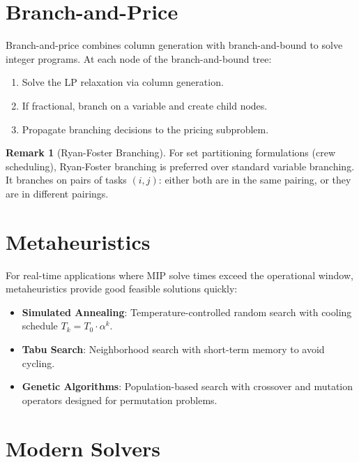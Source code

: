 \documentclass[11pt,a4paper]{book}
\theoremstyle{definition}
\newtheorem{remark}[theorem]{Remark}
\begin{document}
\section{Branch-and-Price}

Branch-and-price combines column generation with branch-and-bound to solve
integer programs. At each node of the branch-and-bound tree:
\begin{enumerate}
  \item Solve the LP relaxation via column generation.
  \item If fractional, branch on a variable and create child nodes.
  \item Propagate branching decisions to the pricing subproblem.
\end{enumerate}

\begin{remark}[Ryan-Foster Branching]
For set partitioning formulations (crew scheduling), Ryan-Foster branching
is preferred over standard variable branching. It branches on pairs of
tasks $(i,j)$: either both are in the same pairing, or they are in
different pairings.
\end{remark}

\section{Metaheuristics}

For real-time applications where MIP solve times exceed the operational
window, metaheuristics provide good feasible solutions quickly:

\begin{itemize}
  \item \textbf{Simulated Annealing}: Temperature-controlled random search
    with cooling schedule $T_k = T_0 \cdot \alpha^k$.
  \item \textbf{Tabu Search}: Neighborhood search with short-term memory
    to avoid cycling.
  \item \textbf{Genetic Algorithms}: Population-based search with crossover
    and mutation operators designed for permutation problems.
\end{itemize}

\section{Modern Solvers}
\end{document}
